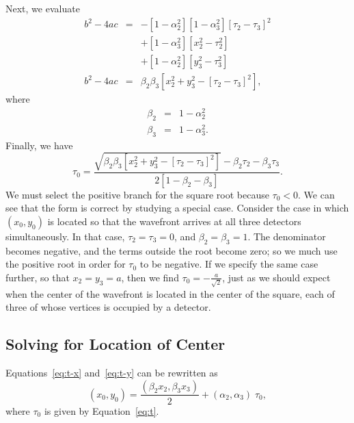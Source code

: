 \documentclass[twocolumn]{article}
\begin{document}
Next, we evaluate
\begin{eqnarray}
   \nonumber
   b^2 - 4ac &=& - \left[1 - \alpha_2^2\right] \left[1 - \alpha_3^2\right]
                   \left[\tau_2 - \tau_3\right]^2\\
   \nonumber
              && + \left[1 - \alpha_3^2\right] \left[x_2^2 - \tau_2^2\right]\\
   \nonumber
              && + \left[1 - \alpha_2^2\right] \left[y_3^2 -
                 \tau_3^2\right]\\[5pt]
   b^2 - 4ac &=& \beta_2 \beta_3 \left[x_2^2 + y_3^2 - \left[\tau_2 -
                 \tau_3\right]^2\right],
\end{eqnarray}
where
\begin{eqnarray}
   \beta_2 &=& 1 - \alpha_2^2\\[5pt]
   \beta_3 &=& 1 - \alpha_3^2.
\end{eqnarray}
Finally, we have
\begin{equation}
   \tau_0 = \frac{ \sqrt{\beta_2 \beta_3 \left[x_2^2 + y_3^2 - \left[\tau_2 -
            \tau_3\right]^2\right]} - \beta_2 \tau_2 - \beta_3 \tau_3 }{2
            \left[1 - \beta_2 - \beta_3\right]}.
   \label{eq:t}
\end{equation}
We must select the positive branch for the square root because $\tau_0 < 0$.
We can see that the form is correct by studying a special case.  Consider the
case in which $(x_0, y_0)$ is located so that the wavefront arrives at all
three detectors simultaneously.  In that case, $\tau_2 = \tau_3 = 0$, and
$\beta_2 = \beta_3 = 1$.  The denominator becomes negative, and the terms
outside the root become zero; so we much use the positive root in order for
$\tau_0$ to be negative.  If we specify the same case further, so that $x_2 =
y_3 = a$, then we find $\tau_0 = -\frac{a}{\sqrt{2}}$, just as we should expect
when the center of the wavefront is located in the center of the square, each
of three of whose vertices is occupied by a detector.

\subsection{Solving for Location of Center}

Equations~\ref{eq:t-x} and~\ref{eq:t-y} can be rewritten as
\begin{equation}
   (x_0, y_0) = \frac{(\beta_2 x_2, \beta_3 x_3)}{2} + (\alpha_2, \alpha_3) \;
                \tau_0,
\end{equation}
where $\tau_0$ is given by Equation~\ref{eq:t}.
\end{document}
